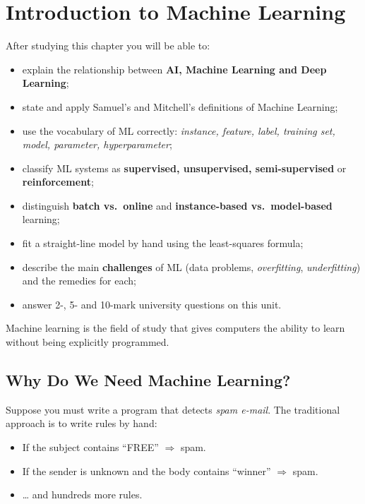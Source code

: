 \chapter{Introduction to Machine Learning}
\label{ch:intro}
\begin{objectives}
After studying this chapter you will be able to:
\begin{itemize}
  \item explain the relationship between \textbf{AI, Machine Learning and Deep Learning};
  \item state and apply Samuel's and Mitchell's definitions of Machine Learning;
  \item use the vocabulary of ML correctly: \emph{instance, feature, label, training set, model, parameter, hyperparameter};
  \item classify ML systems as \textbf{supervised, unsupervised, semi-supervised} or \textbf{reinforcement};
  \item distinguish \textbf{batch vs.\ online} and \textbf{instance-based vs.\ model-based} learning;
  \item fit a straight-line model by hand using the least-squares formula;
  \item describe the main \textbf{challenges} of ML (data problems, \emph{overfitting}, \emph{underfitting}) and the remedies for each;
  \item answer 2-, 5- and 10-mark university questions on this unit.
\end{itemize}
\end{objectives}

\begin{pullquote}
Machine learning is the field of study that gives computers the ability to learn without being explicitly programmed.
\end{pullquote}

\section{Why Do We Need Machine Learning?}

Suppose you must write a program that detects \emph{spam e-mail}. The traditional approach is to write rules by hand:

\begin{itemize}
  \item If the subject contains ``FREE'' $\Rightarrow$ spam.
  \item If the sender is unknown and the body contains ``winner'' $\Rightarrow$ spam.
  \item \ldots{} and hundreds more rules.
\end{itemize}

